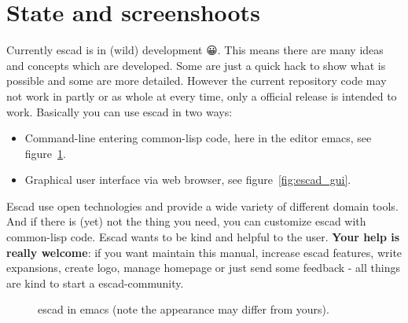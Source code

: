 \documentclass[a4paper, 12pt, openany]{scrbook}
\begin{document}
\section{State and screenshoots}
Currently escad is in (wild) development { 😀}. This means there are many ideas and concepts which are developed. Some are just a quick hack to show what is possible and some are more detailed. However the current repository code may not work in partly or as whole at every time, only a official release is intended to work.
Basically you can use escad in two ways:
\begin{itemize}
\item Command-line entering common-lisp code, here in the editor emacs, see figure~\ref{fig:escad_emacs}.
\item Graphical user interface via web browser, see figure~\ref{fig:escad_gui}.
\end{itemize}
Escad use open technologies and provide a wide variety of different domain tools. And if there is (yet) not the thing you need, you can customize escad with common-lisp code. Escad wants to be kind and helpful to the user. \textbf{Your help is really welcome}: if you want maintain this manual, increase escad features, write expansions, create logo, manage homepage or just send some feedback - all things are kind to start a escad-community.
\begin{figure}[htbp]
  \centering
  \caption{escad in emacs (note the appearance may differ from yours).}
  \label{fig:escad_emacs}
\end{figure}
\end{document}
